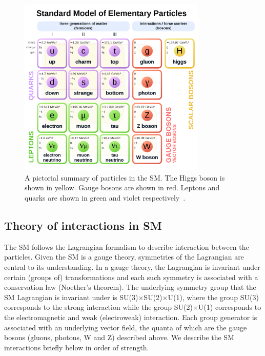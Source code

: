 \begin{figure}[hbtp]
 \begin{center}
   \includegraphics[width=0.8\textwidth]{plots_and_figures/chapter2/SM_particles.pdf}
   \caption{A pictorial summary of particles in the SM. The Higgs boson is shown in yellow. Gauge bosons are shown in red. Leptons and quarks are shown in green and violet respectively~\cite{sm_zoo}.}
   \label{fig:sm_zoo}
 \end{center}
\end{figure}


\subsection{Theory of interactions in SM}
The SM follows the Lagrangian formalism to describe interaction between the particles. Given the SM is a gauge theory, symmetries of the Lagrangian are central to its understanding. In a gauge theory, the Lagrangian is invariant under certain (groups of) transformations and each such symmetry is associated with a conservation law (Noether's theorem). The underlying symmetry group that the SM Lagrangian is invariant under is SU(3)$\times$SU(2)$\times$U(1), where the group SU(3) corresponds to the strong interaction while the group SU(2)$\times$U(1) corresponds to the electromagnetic and weak (electroweak) interaction. Each group generator is associated with an underlying vector field, the quanta of which are the gauge bosons (gluons, photons, W and Z) described above. We describe the SM interactions briefly below in order of strength.

